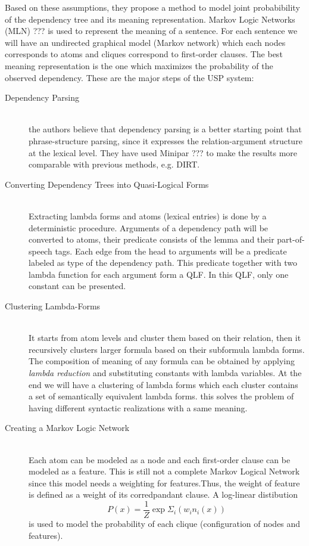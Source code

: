 \documentclass[12pt]{report}
\begin{document}
Based on these assumptions, they propose a method to model joint probabibility of the dependency tree
and its meaning representation. Markov Logic Networks (MLN) ??? is used to represent the meaning of a sentence.
For each sentence we will have an undirected graphical model (Markov network) which each nodes corresponds to atoms
and cliques correspond to first-order clauses. The best meaning representation is the one which 
maximizes the probability of the observed dependency. %
These are the major steps of the USP system:
\begin{description}
  \item[Dependency Parsing] \hfill \\
  the authors believe that dependency parsing is a better starting point that phrase-structure parsing, since it expresses
   the relation-argument structure at the lexical level. They have used Minipar ??? to make the results more comparable with previous
   methods, e.g. DIRT.
  \item[Converting Dependency Trees into Quasi-Logical Forms] \hfill \\
  Extracting lambda forms and atoms (lexical entries) is done by a deterministic procedure. 
  Arguments of a dependency path will be converted to atoms, their predicate consists of the lemma and their part-of-speech tags.
  Each edge from the head to arguments will be a predicate labeled as type of the dependency path.
  This predicate together with two lambda function for each argument form a QLF. In this QLF, only one constant can be presented.
  
  \item[Clustering Lambda-Forms] \hfill \\
  It starts from atom levels and cluster them based on their relation, then it recursively clusters larger formula
  based on their subformula lambda forms. The composition of meaning of any formula can be obtained by applying
  \emph{lambda reduction} and substituting constants with lambda variables. At the end we will have a clustering
  of lambda forms which each cluster contains a set of semantically equivalent lambda forms. this solves
   the problem of having different syntactic realizations with a same meaning.
  
  \item[Creating a Markov Logic Network] \hfill \\
  Each atom can be modeled as a node and each first-order clause can be modeled as a feature. This is still not a complete Markov Logical
  Network since this model needs a weighting for features.Thus, the weight of feature is defined as a weight of
  its corredpandant clause. A log-linear distibution $$ P(x) = \frac{1}{Z}\exp{\Sigma_i{(w_i n_i (x))}} $$is used to model the probability of each clique (configuration of nodes and features).
  

\end{description}
\end{document}
